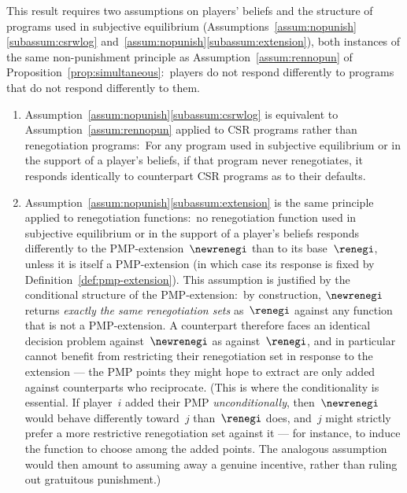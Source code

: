 
This result requires two assumptions on players' beliefs and the structure
of programs used in subjective equilibrium
(Assumptions~\ref{assum:nopunish}\ref{subassum:csrwlog}
and~\ref{assum:nopunish}\ref{subassum:extension}), both instances of the
same non-punishment principle as
Assumption~\ref{assum:rennopun} of Proposition~\ref{prop:simultaneous}:\
players do not respond differently to programs that do not respond
differently to them.
\begin{enumerate}
    \item Assumption~\ref{assum:nopunish}\ref{subassum:csrwlog}
is equivalent to
Assumption~\ref{assum:rennopun}
applied to CSR programs
rather than renegotiation programs:\ For any program
used in subjective equilibrium
or in the support of a player's
beliefs,
if that program never renegotiates,
it responds identically
to counterpart CSR programs
as to their defaults.
\item Assumption~\ref{assum:nopunish}\ref{subassum:extension} is the same
principle applied to renegotiation functions:\ no renegotiation function
used in subjective equilibrium or in the support of a player's beliefs
responds differently to the PMP-extension~$\newrenegi$ than to its
base~$\renegi$, unless it is itself a PMP-extension (in which case its
response is fixed by Definition~\ref{def:pmp-extension}).
This assumption is justified by the conditional structure of the
PMP-extension:\ by construction, $\newrenegi$ returns \textit{exactly the
same renegotiation sets} as~$\renegi$ against any function that is not a
PMP-extension. A counterpart therefore faces an identical decision problem
against~$\newrenegi$ as against~$\renegi$, and in particular cannot
benefit from restricting their renegotiation set in response to the
extension --- the PMP points they might hope to extract are only added
against counterparts who reciprocate.
(This is where the conditionality is essential. If player~$i$ added
their PMP \textit{unconditionally}, then~$\newrenegi$ would behave
differently toward~$j$ than~$\renegi$ does, and~$j$ might strictly prefer
a more restrictive renegotiation set against it --- for instance, to
induce the \selfunction{} function to choose among the added points. The
analogous assumption would then amount to assuming away a genuine
incentive, rather than ruling out gratuitous punishment.)
\end{enumerate}

